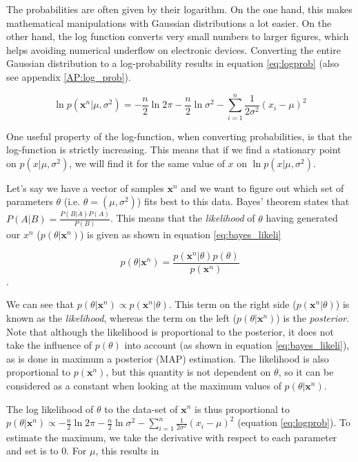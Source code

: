 The probabilities are often given by their logarithm. On the one hand, this makes mathematical manipulations with Gaussian distributions a lot easier. On the other hand, the log function converts very small numbers to larger figures, which helps avoiding numerical underflow on electronic devices. Converting the entire Gaussian distribution to a log-probability results in equation \ref{eq:logprob} (also see appendix \ref{AP:log_prob}).


\begin{equation}\label{eq:logprob}
    \ln p(\textbf{x}^n | \mu, \sigma^2) = -\frac{n}{2} \ln 2 \pi -\frac{n}{2} \ln \sigma ^2 - \sum_{i=1}^{n} \frac{1}{2\sigma ^2}(x_i - \mu)^2
\end{equation}

One useful property of the log-function, when converting probabilities, is that the log-function is strictly increasing. This means that if we find a stationary point on $p(x|\mu, \sigma^2)$, we will find it for the same value of $x$ on $\ln p(x|\mu, \sigma^2)$.

Let's say we have a vector of samples $\textbf{x}^n$ and we want to figure out which set of parameters $\theta$ (i.e. $\theta = (\mu, \sigma^2)$) fits best to this data. Bayes' theorem states that $P(A|B) = \frac{P(B|A) P(A)}{P(B)}$. This means that the \textit{likelihood} of $\theta$ having generated our $x^n$ ($p(\theta|\textbf{x}^n)$) is given as shown in equation \ref{eq:bayes_likeli}

\begin{equation}\label{eq:bayes_likeli}
p(\theta|\textbf{x}^n) = \frac{p(\textbf{x}^n|\theta)p(\theta)}{p(\textbf{x}^n)}
\end{equation}.

We can see that $p(\theta|\textbf{x}^n) \propto p(\textbf{x}^n|\theta)$. This term on the right side ($p(\textbf{x}^n|\theta)$) is known as the \textit{likelihood}, whereas the term on the left ($p(\theta|\textbf{x}^n)$) is the \textit{posterior}. Note that although the likelihood is proportional to the posterior, it does not take the influence of $p(\theta)$ into account (as shown in equation \ref{eq:bayes_likeli}), as is done in maximum a posterior (MAP) estimation. The likelihood is also proportional to $p(\textbf{x}^n)$, but this quantity is not dependent on $\theta$, so it can be considered as a constant when looking at the maximum values of $p(\theta|\textbf{x}^n)$. 

The log likelihood of $\theta$ to the data-set of $\textbf{x}^n$ is thus proportional to $p(\theta|\textbf{x}^n) \propto -\frac{n}{2} \ln 2 \pi -\frac{n}{2} \ln \sigma ^2 - \sum_{i=1}^{n} \frac{1}{2\sigma ^2}(x_i - \mu)^2$ (equation \ref{eq:logprob}). To estimate the maximum, we take the derivative with respect to each parameter and set is to $0$. For $\mu$, this results in


